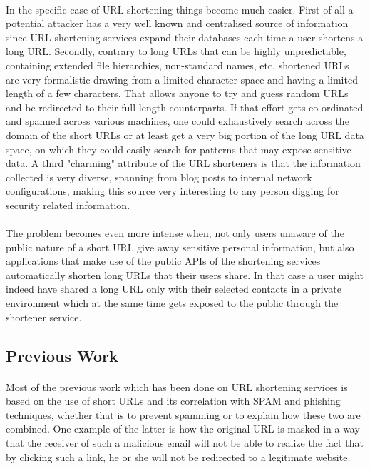 \documentclass[12pt]{article}
\begin{document}
\paragraph{}
In the specific case of URL shortening things become much easier. First of all a potential attacker has a very well known and centralised source of information since URL shortening services expand their databases each time a user shortens a long URL. Secondly, contrary to long URLs that can be highly unpredictable, containing extended file hierarchies, non-standard names, etc, shortened URLs are very formalistic drawing from a limited character space and having a limited length of a few characters. That allows anyone to try and guess random URLs and be redirected to their full length counterparts. If that effort gets co-ordinated and spanned across various machines, one could exhaustively search across the domain of the short URLs or at least get a very big portion of the long URL data space, on which they could easily search for patterns that may expose sensitive data. A third "charming" attribute of the URL shorteners is that the information collected is very diverse, spanning from blog posts to internal network configurations, making this source very interesting to any person digging for security related information. 
\paragraph{}
The problem becomes even more intense when, not only users unaware of the public nature of a short URL give away sensitive personal information, but also applications that make use of the public APIs of the shortening services automatically shorten long URLs that their users share. In that case a user might indeed have shared a long URL only with their selected contacts in a private environment which at the same time gets exposed to the public through the shortener service. 

\subsection{Previous Work}

\paragraph{}
Most of the previous work which has been done on URL shortening services is based on the use of short URLs and its correlation with SPAM and phishing techniques, whether that is to prevent spamming or to explain how these two are combined. One example of the latter is how the original URL is masked in a way that the receiver of such a malicious email will not be able to realize the fact that by clicking such a link, he or she will not be redirected to a legitimate website.\cite{consider}\cite{case}\cite{risk}
 
\end{document}
